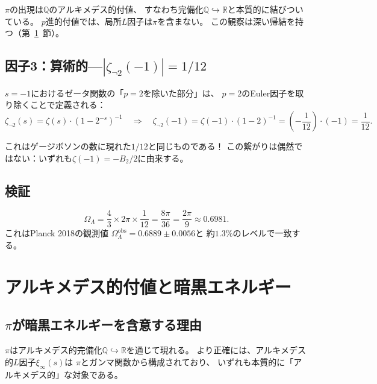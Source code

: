 \documentclass[12pt,a4paper]{article}
\theoremstyle{definition}
\newcommand{\Q}{\mathbb{Q}}
\newcommand{\R}{\mathbb{R}}
\newcommand{\OmL}{\Omega_\Lambda}
\begin{document}
$\pi$の出現は$\Q$のアルキメデス的付値、
すなわち完備化$\Q\hookrightarrow\R$と本質的に結びついている。
$p$進的付値では、局所$L$因子は$\pi$を含まない。
この観察は深い帰結を持つ（第~\ref{sec:archimedean}~節）。

\subsection{因子3：算術的---$|\zeta_{\neg 2}(-1)| = 1/12$}

$s=-1$におけるゼータ関数の「$p=2$を除いた部分」は、
$p=2$のEuler因子を取り除くことで定義される：
\begin{equation}
  \zeta_{\neg 2}(s) = \zeta(s)\cdot(1-2^{-s})^{-1}
  \quad\Longrightarrow\quad
  \zeta_{\neg 2}(-1)
    = \zeta(-1)\cdot(1-2)^{-1}
    = \left(-\frac{1}{12}\right)\cdot(-1)
    = \frac{1}{12}.
\end{equation}

これはゲージボソンの数に現れた$1/12$と同じものである！
この繋がりは偶然ではない：いずれも$\zeta(-1)=-B_2/2$に由来する。

\subsection{検証}

\begin{equation}
  \OmL = \frac{4}{3}\times 2\pi\times\frac{1}{12}
       = \frac{8\pi}{36} = \frac{2\pi}{9}
       \approx 0.6981.
\end{equation}
これはPlanck 2018の観測値
$\OmL^{\text{obs}} = 0.6889 \pm 0.0056$と
約$1.3\%$のレベルで一致する。

\section{アルキメデス的付値と暗黒エネルギー}\label{sec:archimedean}

\subsection{$\pi$が暗黒エネルギーを含意する理由}

$\pi$はアルキメデス的完備化$\Q\hookrightarrow\R$を通じて現れる。
より正確には、アルキメデス的$L$因子$\xi_\infty(s)$は
$\pi$とガンマ関数から構成されており、
いずれも本質的に「アルキメデス的」な対象である。
\end{document}
